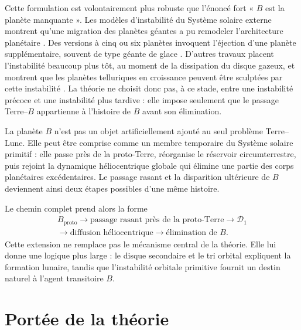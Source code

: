 \documentclass[11pt,a4paper,openany]{report}
\begin{document}
Cette formulation est volontairement plus robuste que l'énoncé fort « $B$ est la planète
manquante ». Les modèles d'instabilité du Système solaire externe montrent qu'une migration des
planètes géantes a pu remodeler l'architecture planétaire \cite{Tsiganis2005,Gomes2005}. Des
versions à cinq ou six planètes invoquent l'éjection d'une planète supplémentaire, souvent de type
géante de glace \cite{Nesvorny2011,NesvornyMorbidelli2012}. D'autres travaux placent l'instabilité
beaucoup plus tôt, au moment de la dissipation du disque gazeux, et montrent que les planètes
telluriques en croissance peuvent être sculptées par cette instabilité \cite{Liu2022,Clement2018}.
La théorie ne choisit donc pas, à ce stade, entre une instabilité précoce et une instabilité plus
tardive : elle impose seulement que le passage Terre--$B$ appartienne à l'histoire de $B$ avant son
élimination.

\begin{ideephys}
La planète $B$ n'est pas un objet artificiellement ajouté au seul problème Terre--Lune. Elle peut
être comprise comme un membre temporaire du Système solaire primitif : elle passe près de la
proto-Terre, réorganise le réservoir circumterrestre, puis rejoint la dynamique héliocentrique
globale qui élimine une partie des corps planétaires excédentaires. Le passage rasant et la
disparition ultérieure de $B$ deviennent ainsi deux étapes possibles d'une même histoire.
\end{ideephys}

Le chemin complet prend alors la forme
\begin{equation}
\boxed{\begin{gathered}
B_{\mathrm{proto}}\longrightarrow\text{passage rasant près de la proto-Terre}
\longrightarrow\mathcal{D}_1\\
\longrightarrow\text{diffusion héliocentrique}
\longrightarrow\text{élimination de }B.
\end{gathered}}
\label{eq:cheminB}
\end{equation}
Cette extension ne remplace pas le mécanisme central de la théorie. Elle lui donne une logique
plus large : le disque secondaire et le tri orbital expliquent la formation lunaire, tandis que
l'instabilité orbitale primitive fournit un destin naturel à l'agent transitoire $B$.

\section{Portée de la théorie}
\end{document}
